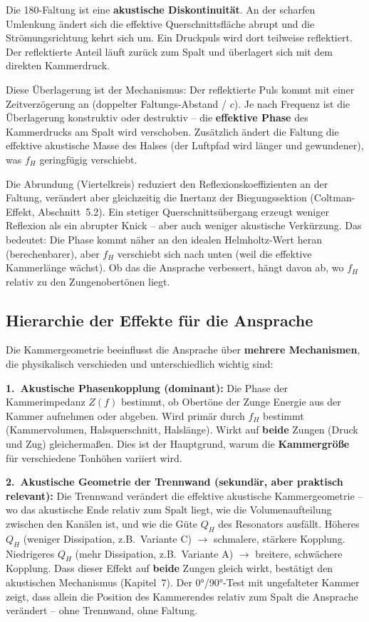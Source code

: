 \documentclass[11pt,a4paper]{article}
\begin{document}
Die 180\textdegree{}-Faltung ist eine \textbf{akustische Diskontinuität}. An der scharfen Umlenkung ändert sich die effektive Querschnittsfläche abrupt und die Strömungsrichtung kehrt sich um. Ein Druckpuls wird dort teilweise reflektiert. Der reflektierte Anteil läuft zurück zum Spalt und überlagert sich mit dem direkten Kammerdruck.

Diese Überlagerung ist der Mechanismus: Der reflektierte Puls kommt mit einer Zeitverzögerung an (doppelter Faltungs-Abstand / $c$). Je nach Frequenz ist die Überlagerung konstruktiv oder destruktiv -- die \textbf{effektive Phase} des Kammerdrucks am Spalt wird verschoben. Zusätzlich ändert die Faltung die effektive akustische Masse des Halses (der Luftpfad wird länger und gewundener), was $f_H$ geringfügig verschiebt.

Die Abrundung (Viertelkreis) reduziert den Reflexionskoeffizienten an der Faltung, verändert aber gleichzeitig die Inertanz der Biegungssektion (Coltman-Effekt, Abschnitt~5.2). Ein stetiger Querschnittsübergang erzeugt weniger Reflexion als ein abrupter Knick -- aber auch weniger akustische Verkürzung. Das bedeutet: Die Phase kommt näher an den idealen Helmholtz-Wert heran (berechenbarer), aber $f_H$ verschiebt sich nach unten (weil die effektive Kammerlänge wächst). Ob das die Ansprache verbessert, hängt davon ab, wo $f_H$ relativ zu den Zungenobertönen liegt.

\subsection{Hierarchie der Effekte für die Ansprache}

Die Kammergeometrie beeinflusst die Ansprache über \textbf{mehrere Mechanismen}, die physikalisch verschieden und unterschiedlich wichtig sind:

\textbf{1.\ Akustische Phasenkopplung (dominant):} Die Phase der Kammerimpedanz $Z(f)$ bestimmt, ob Obertöne der Zunge Energie aus der Kammer aufnehmen oder abgeben. Wird primär durch $f_H$ bestimmt (Kammervolumen, Halsquerschnitt, Halslänge). Wirkt auf \textbf{beide} Zungen (Druck und Zug) gleichermaßen. Dies ist der Hauptgrund, warum die \textbf{Kammergröße} für verschiedene Tonhöhen variiert wird.

\textbf{2.\ Akustische Geometrie der Trennwand (sekundär, aber praktisch relevant):} Die Trennwand verändert die effektive akustische Kammergeometrie -- wo das \glqq{}akustische Ende\grqq{} relativ zum Spalt liegt, wie die Volumenaufteilung zwischen den Kanälen ist, und wie die Güte $Q_H$ des Resonators ausfällt. Höheres $Q_H$ (weniger Dissipation, z.B.\ Variante C) $\to$ schmalere, stärkere Kopplung. Niedrigeres $Q_H$ (mehr Dissipation, z.B.\ Variante A) $\to$ breitere, schwächere Kopplung. Dass dieser Effekt auf \textbf{beide} Zungen gleich wirkt, bestätigt den akustischen Mechanismus (Kapitel~7). Der 0°/90°-Test mit ungefalteter Kammer zeigt, dass allein die Position des Kammerendes relativ zum Spalt die Ansprache verändert -- ohne Trennwand, ohne Faltung.
\end{document}

